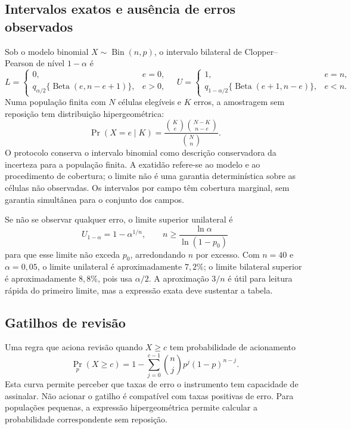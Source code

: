 \subsection{Intervalos exatos e ausência de erros observados}
\label{sec:mat-clopper-pearson}
Sob o modelo binomial $X\sim\operatorname{Bin}(n,p)$, o intervalo bilateral de Clopper--Pearson de nível $1-\alpha$ é~\parencite{ClopperPearson1934}
\begin{equation}
L=\begin{cases}0,&e=0,\\q_{\alpha/2}\{\operatorname{Beta}(e,n-e+1)\},&e>0,\end{cases}
\quad
U=\begin{cases}1,&e=n,\\q_{1-\alpha/2}\{\operatorname{Beta}(e+1,n-e)\},&e<n.\end{cases}
\label{eq:mat-cp}
\end{equation}
Numa população finita com $N$ células elegíveis e $K$ erros, a amostragem sem reposição tem distribuição hipergeométrica:
\begin{equation}
\Pr(X=e\mid K)=\frac{\binom Ke\binom{N-K}{n-e}}{\binom Nn}.
\label{eq:mat-hipergeometrica}
\end{equation}
O protocolo conserva o intervalo binomial como descrição conservadora da incerteza para a população finita. A exatidão refere-se ao modelo e ao procedimento de cobertura; o limite não é uma garantia determinística sobre as células não observadas. Os intervalos por campo têm cobertura marginal, sem garantia simultânea para o conjunto dos campos.

Se não se observar qualquer erro, o limite superior unilateral é
\begin{equation}
U_{1-\alpha}=1-\alpha^{1/n},
\qquad n\geq\frac{\ln\alpha}{\ln(1-p_0)}
\label{eq:mat-zero-erros}
\end{equation}
para que esse limite não exceda $p_0$, arredondando $n$ por excesso. Com $n=40$ e $\alpha=0{,}05$, o limite unilateral é aproximadamente $7{,}2\%$; o limite bilateral superior é aproximadamente $8{,}8\%$, pois usa $\alpha/2$. A aproximação $3/n$ é útil para leitura rápida do primeiro limite, mas a expressão exata deve sustentar a tabela.

\subsection{Gatilhos de revisão}
\label{sec:mat-gatilhos}
Uma regra que aciona revisão quando $X\geq c$ tem probabilidade de acionamento
\begin{equation}
\Pr_p(X\geq c)=1-\sum_{j=0}^{c-1}\binom njp^j(1-p)^{n-j}.
\label{eq:mat-gatilho}
\end{equation}
Esta curva permite perceber que taxas de erro o instrumento tem capacidade de assinalar. Não acionar o gatilho é compatível com taxas positivas de erro. Para populações pequenas, a expressão hipergeométrica permite calcular a probabilidade correspondente sem reposição.

